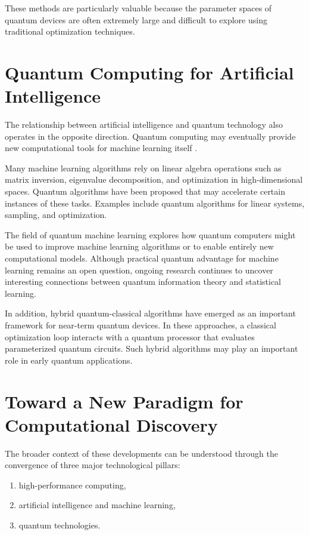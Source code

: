 \documentclass[11pt]{article}
\begin{document}
These methods are particularly valuable because the parameter spaces
of quantum devices are often extremely large and difficult to explore
using traditional optimization techniques.

\section{Quantum Computing for Artificial Intelligence}

The relationship between artificial intelligence and quantum
technology also operates in the opposite direction. Quantum computing
may eventually provide new computational tools for machine learning
itself \cite{schuld2021}.

Many machine learning algorithms rely on linear algebra operations
such as matrix inversion, eigenvalue decomposition, and optimization
in high-dimensional spaces. Quantum algorithms have been proposed that
may accelerate certain instances of these tasks. Examples include
quantum algorithms for linear systems, sampling, and optimization.

The field of quantum machine learning explores how quantum computers
might be used to improve machine learning algorithms or to enable
entirely new computational models. Although practical quantum
advantage for machine learning remains an open question, ongoing
research continues to uncover interesting connections between quantum
information theory and statistical learning.

In addition, hybrid quantum-classical algorithms have emerged as an
important framework for near-term quantum devices. In these
approaches, a classical optimization loop interacts with a quantum
processor that evaluates parameterized quantum circuits. Such hybrid algorithms may play an
important role in early quantum applications.

\section{Toward a New Paradigm for Computational Discovery}

The broader context of these developments can be understood through
the convergence of three major technological pillars:

\begin{enumerate}
\item high-performance computing,
\item artificial intelligence and machine learning,
\item quantum technologies.
\end{enumerate}
\end{document}
